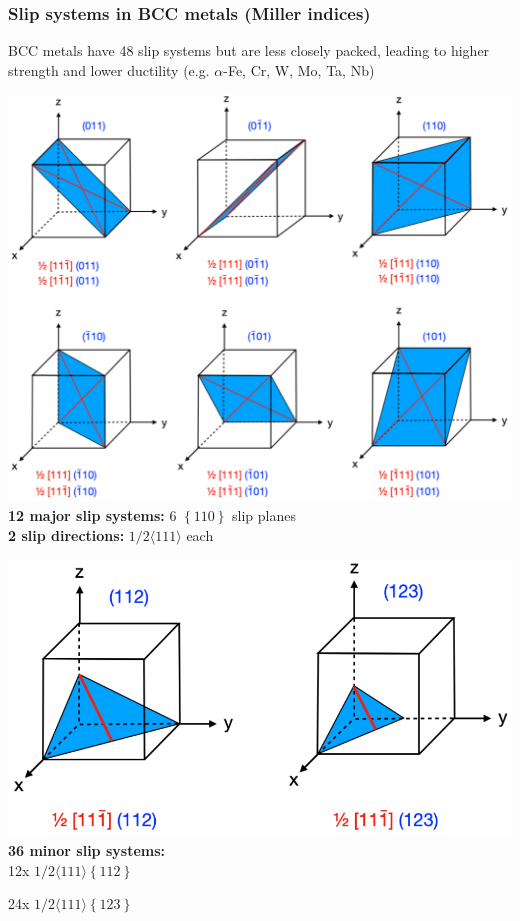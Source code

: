 \documentclass{article}
\begin{document}
\newpage
\subsubsection{Slip systems in BCC metals (Miller indices)}
BCC metals have 48 slip systems but are less closely packed, leading to higher strength
and lower ductility (e.g. $\alpha$-Fe, Cr, W, Mo, Ta, Nb)

\begin{minipage}[t]{0.6\textwidth}
  \centering
  \includegraphics[width=\textwidth]{media/BCC_miller_major.png}
  \textbf{12 major slip systems:} 6 $\left\{110\right\}$ slip planes\\
  \textbf{2 slip directions:} $1/2 \langle 111 \rangle$ each
\end{minipage}
\begin{minipage}[t]{0.4\textwidth}
  \centering
  \includegraphics[width=\textwidth]{media/BCC_miller_minor.png}
  \textbf{36 minor slip systems:}\\
  12x $1/2 \langle111\rangle \left\{112\right\}$

  24x $1/2 \langle111\rangle \left\{123\right\}$
\end{minipage}
\end{document}

